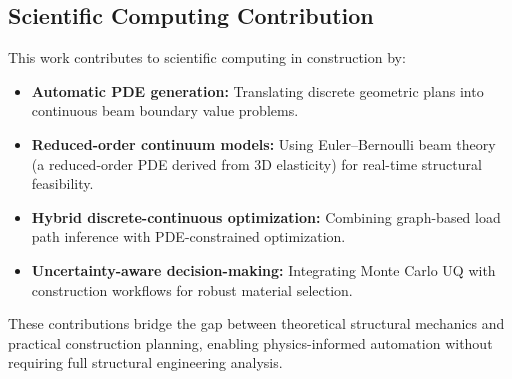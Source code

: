 \subsection{Scientific Computing Contribution}

This work contributes to scientific computing in construction by:
\begin{itemize}
  \item \textbf{Automatic PDE generation:} Translating discrete geometric plans into continuous beam boundary value problems.
  \item \textbf{Reduced-order continuum models:} Using Euler--Bernoulli beam theory (a reduced-order PDE derived from 3D elasticity) for real-time structural feasibility.
  \item \textbf{Hybrid discrete-continuous optimization:} Combining graph-based load path inference with PDE-constrained optimization.
  \item \textbf{Uncertainty-aware decision-making:} Integrating Monte Carlo UQ with construction workflows for robust material selection.
\end{itemize}

These contributions bridge the gap between theoretical structural mechanics and practical construction planning, enabling physics-informed automation without requiring full structural engineering analysis.
